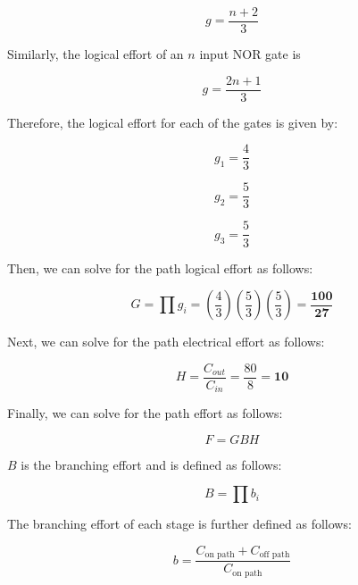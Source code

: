 \documentclass[fleqn]{article}
\begin{document}
\begin{enumerate}
\begin{enumerate}
				\begin{equation*}
					g = \frac{n+2}{3}
				\end{equation*}
				
				Similarly, the logical effort of an $n$ input NOR gate is
				
				\begin{equation*}
					g = \frac{2n+1}{3}
				\end{equation*}
				
				Therefore, the logical effort for each of the gates is given by:
				
				\begin{equation*}
					g_1 = \frac{4}{3}
				\end{equation*}
				
				\begin{equation*}
					g_2 = \frac{5}{3}
				\end{equation*}
				
				\begin{equation*}
					g_3 = \frac{5}{3}
				\end{equation*}
				
				Then, we can solve for the path logical effort as follows:
				
				\begin{equation*}
					G = \prod{g_i} = \left(\frac{4}{3}\right)\left(\frac{5}{3}\right)\left(\frac{5}{3}\right) = \mathbf{\frac{100}{27}}
				\end{equation*}
				
				Next, we can solve for the path electrical effort as follows:
				
				\begin{equation*}
					H = \frac{C_{out}}{C_{in}} = \frac{80}{8} = \mathbf{10}
				\end{equation*}
				
				Finally, we can solve for the path effort as follows:
				
				\begin{equation*}
					F = GBH
				\end{equation*}
				
				$B$ is the branching effort and is defined as follows:
				
				\begin{equation*}
					B = \prod{b_i}
				\end{equation*}
				
				The branching effort of each stage is further defined as follows:
				
				\begin{equation*}
					b = \frac{C_{\text{on path}} + C_{\text{off path}}}{C_\text{on path}}
				\end{equation*}
				

\end{enumerate}
\end{enumerate}
\end{document}
